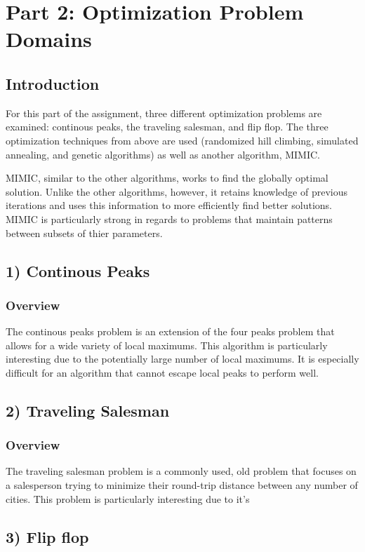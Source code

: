 \documentclass[h]{article}
\begin{document}
\section*{Part 2: Optimization Problem Domains}
\subsection*{ Introduction}  
For this part of the assignment, three different optimization problems are 
examined: continous peaks, the traveling salesman, and flip flop.  The three
optimization techniques from above are used (randomized hill climbing, simulated annealing, and genetic algorithms) 
as well as another algorithm, MIMIC.

MIMIC, similar to the other algorithms, works to find the globally optimal 
solution.  Unlike the other algorithms, however, it retains knowledge of previous 
iterations and uses this information to more efficiently find better solutions.  MIMIC is particularly strong in regards to 
problems that maintain patterns between subsets of thier parameters.

\subsection*{1) Continous Peaks}  
\subsubsection*{Overview}
The continous peaks problem is an extension of the four peaks problem that 
allows for a wide variety of local maximums.  This algorithm is particularly interesting due to the potentially large 
number of local maximums.  It is especially difficult for an algorithm that cannot escape 
local peaks to perform well.

\subsection*{2) Traveling Salesman}  
\subsubsection*{Overview}
The traveling salesman problem is a commonly used, old problem that focuses on a 
salesperson trying to minimize their round-trip distance between any number of cities.  This problem is particularly 
interesting  due to it's 

\subsection*{3) Flip flop}  
\end{document}
